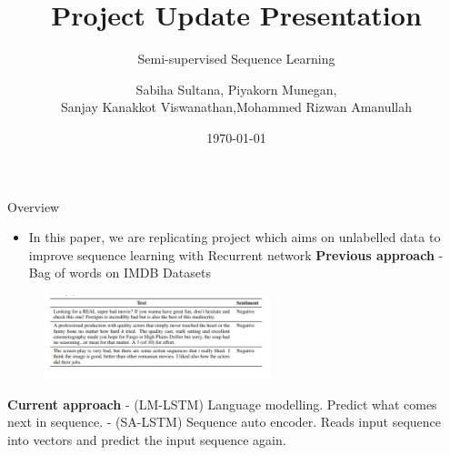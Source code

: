 \documentclass[aspectratio=169,xcolor=dvipsnames]{beamer}
\title[short title]{Project Update Presentation}
\subtitle{Semi-supervised Sequence Learning}
\author[Sanjay K V] {Sabiha Sultana\inst{1}, Piyakorn Munegan\inst{2},\\ Sanjay Kanakkot Viswanathan\inst{3},\break Mohammed Rizwan Amanullah\inst{4}}
\institute[NTU] %
{
    Department of Computing, \\
    Macquarie University 
    \vskip 3pt
}
\date{\today} %
\begin{document}
\begin{frame}
    \titlepage
\end{frame}

\begin{frame}{Overview}
    \tableofcontents
\begin{itemize}
        \item In this paper, we are replicating project which aims on unlabelled data to improve sequence learning with Recurrent network \break
        \textbf{Previous approach}
        - \textbfUsing Bag of words on IMDB Datasets \break
    \end{itemize}

  \begin{figure} 
  \includegraphics[width=250]{Introduction.png}
\end{figure}
\textbf{Current approach}\break
        - (LM-LSTM) Language modelling. Predict what comes next in sequence.\break
        - (SA-LSTM) Sequence auto encoder. Reads input sequence into vectors and \break predict the input sequence again.
 
  
\end{frame}
\end{document}
